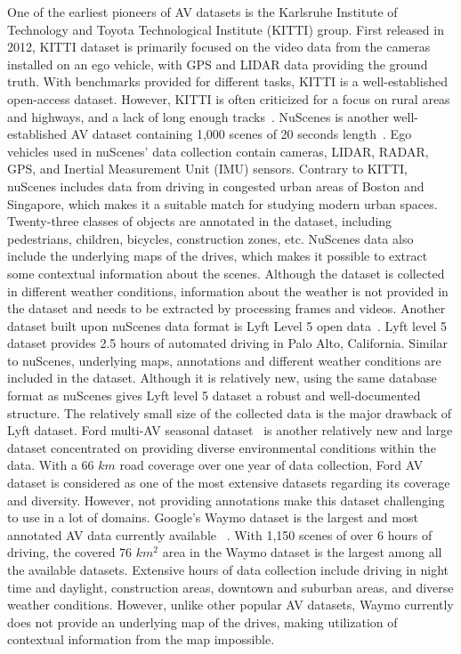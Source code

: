 One of the earliest pioneers of AV datasets is the  Karlsruhe Institute of Technology
and Toyota Technological Institute (KITTI) group. First released in 2012, KITTI dataset is primarily focused on the video data from the cameras installed on an ego vehicle, with GPS and LIDAR data providing the ground truth. With benchmarks provided for different tasks, KITTI is a well-established open-access dataset. However, KITTI is often criticized for a focus on rural areas and highways, and a lack of long enough tracks~\cite{Geiger2013IJRR}. NuScenes is another well-established AV dataset containing 1,000 scenes of 20 seconds length~\cite{nuscenes2019}. Ego vehicles used in nuScenes' data collection contain cameras, LIDAR, RADAR, GPS, and Inertial Measurement Unit (IMU) sensors. Contrary to KITTI, nuScenes includes data from driving in congested urban areas of Boston and Singapore, which makes it a suitable match for studying modern urban spaces. Twenty-three classes of objects are annotated in the dataset, including pedestrians, children, bicycles, construction zones, etc. NuScenes data also include the underlying maps of the drives, which makes it possible to extract some contextual information about the scenes. Although the dataset is collected in different weather conditions, information about the weather is not provided in the dataset and needs to be extracted by processing frames and videos. 
Another dataset built upon nuScenes data format is Lyft Level 5 open data~\cite{lyft2019}. Lyft level 5 dataset provides 2.5 hours of automated driving in Palo Alto, California. Similar to nuScenes, underlying maps, annotations and different weather conditions are included in the dataset. Although it is relatively new, using the same database format as nuScenes gives Lyft level 5 dataset a robust and well-documented structure. The relatively small size of the collected data is the major drawback of Lyft dataset. Ford multi-AV seasonal dataset~\cite{agarwal2020ford} is another relatively new and large dataset concentrated on providing diverse environmental conditions within the data. With a 66 $km$ road coverage over one year of data collection, Ford AV dataset is considered as one of the most extensive datasets regarding its coverage and diversity. However, not providing annotations make this dataset challenging to use in a lot of domains. Google's Waymo dataset is the largest and most annotated AV data currently available ~\cite{sun2020scalability}. With  1,150 scenes of over 6 hours of driving, the covered 76 $km^2$ area in the Waymo dataset is the largest among all the available datasets. Extensive hours of data collection include driving in night time and daylight, construction areas, downtown and suburban areas, and diverse weather conditions.  However, unlike other popular AV datasets, Waymo currently does not provide an underlying map of the drives, making utilization of contextual information from the map impossible.       





 


